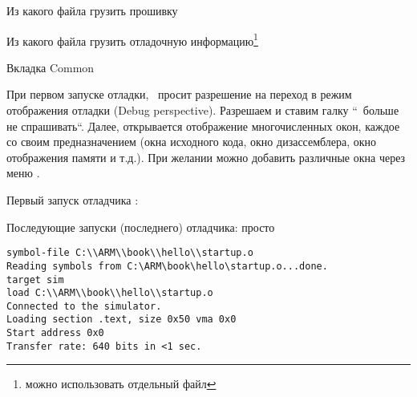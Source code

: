 


Из какого файла грузить прошивку


Из какого файла грузить отладочную информацию\footnote{можно использовать
отдельный  файл}



\bigskip
Вкладка Common

\bigskip





% 

\bigskip
При первом запуске отладки, \eclipse\ просит разрешение на переход в режим
отображения отладки (Debug perspective). Разрешаем и ставим галку “\checkbox\
больше не спрашивать“. Далее, открывается отображение многочисленных окон,
каждое со своим предназначением (окна исходного кода, окно дизассемблера, окно
отображения памяти и т.д.). При желании можно добавить различные окна через меню
\menu{Window>Show View}.

\bigskip

Первый запуск отладчика \bug: 

Последующие запуски (последнего) отладчика: просто  

\bigskip
\begin{lstlisting}
symbol-file C:\\ARM\\book\\hello\\startup.o
Reading symbols from C:\ARM\book\hello\startup.o...done.
target sim
load C:\\ARM\\book\\hello\\startup.o 
Connected to the simulator.
Loading section .text, size 0x50 vma 0x0
Start address 0x0
Transfer rate: 640 bits in <1 sec.
\end{lstlisting}


